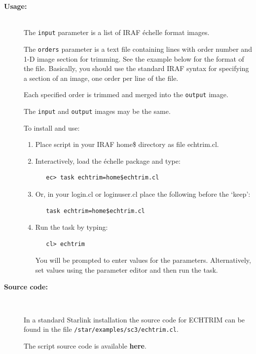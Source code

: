 \documentclass[twoside,11pt]{article}
\newcommand{\htmladdnormallink}[2]{#1}
\newcommand{\htmlref}[2]{#1}
\begin{document}
\begin{description}
\item [{\bf Usage:}] \mbox{} \\
     The \verb+input+ parameter is a list of IRAF \'{e}chelle format images.

     The \verb+orders+ parameter is a text file containing lines with order
     number and 1-D image section for trimming.  See the example below
     for the format of the file.  Basically, you should use the standard
     IRAF syntax for specifying a section of an image, one order per line
     of the file.

     Each specified order is trimmed and merged into the \verb+output+ image.

     The \verb+input+ and \verb+output+ images may be the same.

     To install and use:

\begin{enumerate}

\item Place script in your IRAF home\$ directory as file echtrim.cl.

\item Interactively, load the \'{e}chelle package and type:

\begin{verbatim}
   ec> task echtrim=home$echtrim.cl
\end{verbatim}

\item Or, in your login.cl or loginuser.cl place the following before
      the `keep':

\begin{verbatim}
   task echtrim=home$echtrim.cl
\end{verbatim}

\item Run the task by typing:

\begin{verbatim}
   cl> echtrim
\end{verbatim}

      You will be prompted
      to enter values for the parameters. Alternatively, set values
      using the parameter editor and then run the task.
\end{enumerate}

\item [{\bf Source code:}] \mbox{} \\
\begin{latex}
In a standard Starlink installation the source code for ECHTRIM can be found
in the file \texttt{/star/examples/sc3/echtrim.cl}.
\end{latex}
\begin{htmlonly}
      The script source code is available
      \htmlref{{\bf here}}{se_echtrim_source}.
\end{htmlonly}


\end{description}
\end{document}
